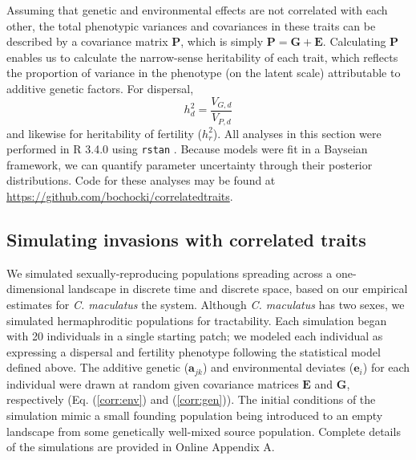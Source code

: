 \documentclass[11pt]{article}
\newcommand{\tom}[1]{{\textit{\color{WildStrawberry}{[#1]}}}}
\def\code#1{\texttt{#1}}
\begin{document}
Assuming that genetic and environmental effects are not correlated with each other, the total phenotypic variances and covariances in these traits can be described by a covariance matrix $\bm{P}$, which is simply $\bm{P} = \bm{G} + \bm{E}$.
Calculating $\bm{P}$ enables us to calculate the narrow-sense heritability of each trait, which reflects the proportion of variance in the phenotype (on the latent scale) attributable to additive genetic factors.
For dispersal,
%
\begin{equation}\label{corr:heritability}
  h^{2}_d = \frac{V_{G,d}}{V_{P,d}}
\end{equation}
%
and likewise for heritability of fertility ($h^{2}_r$).
All analyses in this section were performed in R 3.4.0 \citep{r_core_team_r:_2015} using \code{rstan} \citep{stan_development_team_rstan:_2015}.
Because models were fit in a Bayseian framework, we can quantify parameter uncertainty through their posterior distributions.
Code for these analyses may be found at \url{https://github.com/bochocki/correlatedtraits}.

\subsection*{Simulating invasions with correlated traits}
We simulated sexually-reproducing populations spreading across a one-dimensional landscape in discrete time and discrete space, based on our empirical estimates for \textit{C. maculatus} the system.
Although \textit{C. maculatus} has two sexes, we simulated hermaphroditic populations for tractability.
Each simulation began with 20 individuals in a single starting patch; we modeled each individual as expressing a dispersal and fertility phenotype following the statistical model defined above.
The additive genetic ($\bm{a}_{jk}$) and environmental deviates ($\bm{e}_i$) for each individual were drawn at random given covariance matrices $\bm{E}$ and $\bm{G}$, respectively (Eq. (\ref{corr:env}) and (\ref{corr:gen})).
The initial conditions of the simulation mimic a small founding population being introduced to an empty landscape from some genetically well-mixed source population. 
Complete details of the simulations are provided in Online Appendix A.
\end{document}
